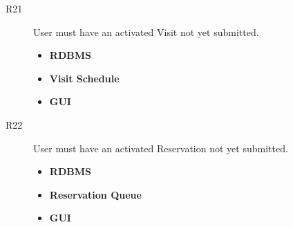 \begin{description}
\item[R21] User must have an activated Visit not yet submitted.
    \begin{itemize}
        \item \textbf{RDBMS}
        \item \textbf{Visit Schedule}
        \item \textbf{GUI}
    \end{itemize}


\item[R22] User must have an activated Reservation not yet submitted.
    \begin{itemize}
        \item \textbf{RDBMS}
        \item \textbf{Reservation Queue}
        \item \textbf{GUI}
    \end{itemize}

\end{description}

